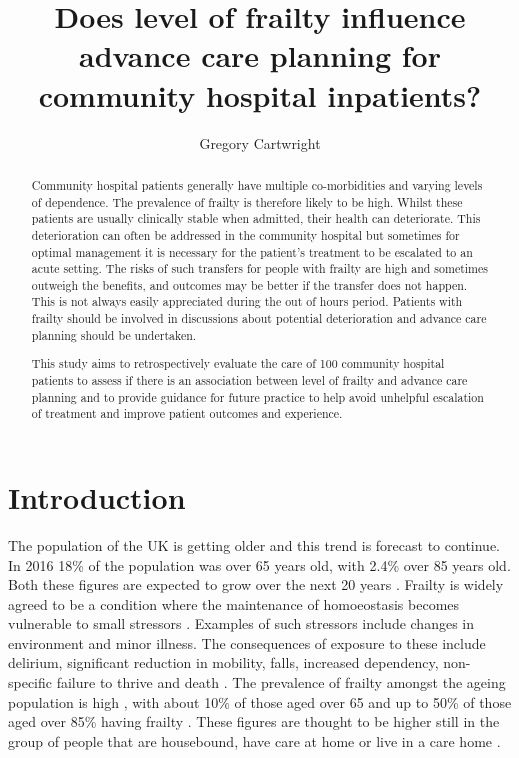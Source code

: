 \documentclass
[
	12pt,
	a4paper,
	oneside,
]{article}
\begin{document}
\author{Gregory Cartwright}
\title{Does level of frailty influence advance care planning 
	for community hospital inpatients?
}
\maketitle
\begin{abstract}
Community hospital patients generally have multiple co-morbidities and varying
levels of dependence. The prevalence of frailty is therefore likely to be high.
Whilst these patients are usually clinically stable when admitted, their health
can deteriorate. This deterioration can often be addressed in the community hospital
but sometimes for optimal management it is necessary for the patient's treatment to be
escalated to an acute setting. The risks of such transfers for people with frailty are high
and sometimes outweigh the benefits, and outcomes may be better if the transfer
does not happen. This is not always easily appreciated during the out of hours period.
Patients with frailty should be involved in discussions about
potential deterioration and advance care planning should be undertaken.

This study aims to retrospectively evaluate the care of 100 community hospital
patients to assess if there is an association between level of frailty and advance
care planning and to provide guidance for future practice to 
help avoid unhelpful escalation of treatment and improve patient outcomes and 
experience.
\end{abstract}
\section{Introduction}

The population of the UK is getting older and this trend is forecast to continue.
In 2016 18\% of the population was over 65 years old, with 2.4\% over 85 years old.
Both these figures are expected to grow over the next 20 years \parencite{ons:17}.
Frailty is widely agreed to be a condition where the maintenance of homoeostasis 
becomes vulnerable to 
small stressors \parencite{vellas:16}.  Examples of such stressors include changes in environment and minor
illness. The consequences of exposure to these include delirium, significant reduction in mobility,
falls, increased dependency, non-specific failure to thrive and death 
\parencite{bgs:14,oliver:14,vellas:16}.
The prevalence of frailty amongst the ageing population is high \parencite{clegg:13},
with about 10\% of those aged over 65 and up to 50\% of
those aged over 85\% having frailty \parencite{bgs:14}. These figures
are thought to be higher still in the group of people that are housebound, 
have care at home or live in a care home \parencite{oliver:14}.
\end{document}
